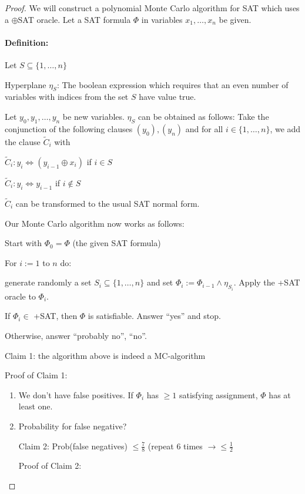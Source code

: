 \documentclass[11pt]{article}
\theoremstyle{definition}
\theoremstyle{definition}
\begin{document}
\begin{proof}

We will construct a polynomial Monte Carlo algorithm for SAT which uses a $\oplus$SAT oracle. Let a SAT formula $ \Phi $ in variables $ x_1, \dots, x_n $ be given.

\paragraph{Definition:} Let $ S \subseteq \{1, \dots, n \} $

Hyperplane $ \eta_S $: The boolean expression which requires that an even number of variables with indices from the set $ S $ have value true.

Let $ y_0, y_1, \dots, y_n $ be new variables. $ \eta_S $ can be obtained as follows: Take the conjunction of the following clauses $ (y_0), (y_n) $ and for all $ i \in \{1, \dots, n \} $, we add the clause $ \tilde C_i $ with

$ \tilde C_i : y_i \Leftrightarrow (y_{i - 1} \oplus x_i) $ if $ i \in S $

$ \tilde C_i : y_i \Leftrightarrow y_{i - 1} $ if $ i \not \in S $

$ \tilde C_i $ can be transformed to the usual SAT normal form.

Our Monte Carlo algorithm now works as follows:

Start with $ \Phi_0 = \Phi $ (the given SAT formula)

For $ i := 1 $ to $ n $ do:

generate randomly a set $ S_i \subseteq \{ 1, \dots, n \} $ and set $ \Phi_i := \Phi_{i - 1} \wedge \eta_{S_i} $. Apply the +SAT oracle to $ \Phi_i $.

If $ \Phi_i \in $ +SAT, then $ \Phi $ is satisfiable. Answer ``yes'' and stop.

Otherwise, answer ``probably no'', ``no''. \medskip

Claim 1: the algorithm above is indeed a MC-algorithm

Proof of Claim 1:
\begin{enumerate}
\item We don't have false positives. If $ \Phi_i $ has $ \geq 1 $ satisfying assignment, $ \Phi $ has at least one.
\item Probability for false negative?

	Claim 2: Prob(false negatives) $ \leq \frac{7}{8} $ (repeat 6 times $ \rightarrow \leq \frac{1}{2}$
	
	Proof of Claim 2:
	

\end{enumerate}
\end{proof}
\end{document}
